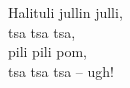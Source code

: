 
            Halituli jullin julli, \\
            tsa tsa tsa, \\
            pili pili pom, \\
            tsa tsa tsa – ugh! \\
